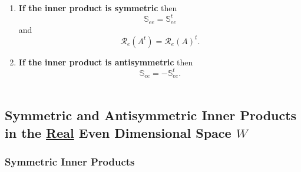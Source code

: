\documentclass[aps,preprint]{revtex4}
\begin{document}
\begin{enumerate}
\item \textbf{If the inner product is symmetric} then \textbf{\ }%
\begin{equation}
\mathbb{S}_{ee}=\mathbb{S}_{ee}^{t}
\end{equation}%
and \textbf{\ }%
\begin{equation}
\mathcal{R}_{e}\left( A^{t}\right) =\mathcal{R}_{e}\left( A\right) ^{t}.
\end{equation}

\item \textbf{If the inner product is antisymmetric }then%
\begin{equation}
\mathbb{S}_{ee}=-\mathbb{S}_{ee}^{t}.
\end{equation}%
\textbf{\ }
\end{enumerate}

\subsection{Symmetric and Antisymmetric Inner Products in the \protect%
\underline{Real} Even Dimensional Space $W$}

\subsubsection{\textbf{Symmetric Inner Products}}
\end{document}
